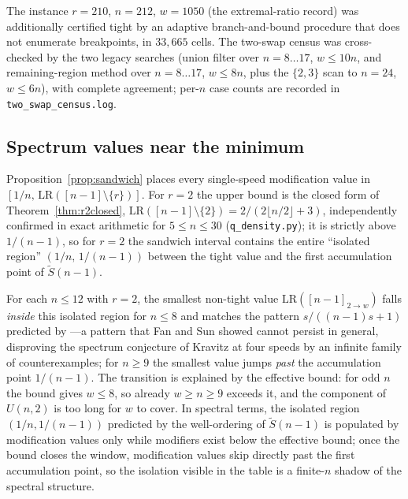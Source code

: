 \documentclass[11pt]{article}
\theoremstyle{definition}
\newcommand{\LR}{\mathrm{LR}}
\begin{document}
The instance $r=210$, $n=212$, $w=1050$ (the extremal-ratio record) was
additionally certified tight by an adaptive branch-and-bound procedure that
does not enumerate breakpoints, in $33{,}665$ cells.  The two-swap census
was cross-checked by the two legacy searches (union filter over
$n=8\ldots17$, $w\le10n$, and remaining-region method over
$n=8\ldots17$, $w\le8n$, plus the $\{2,3\}$ scan to $n=24$, $w\le6n$),
with complete agreement; per-$n$ case counts are recorded in
\texttt{two\_swap\_census.log}.

\subsection{Spectrum values near the minimum}\label{sec:spectrum}
Proposition~\ref{prop:sandwich} places every single-speed modification value
in $[1/n,\,\LR([n-1]\setminus\{r\})]$. For $r=2$ the upper bound is the
closed form of Theorem~\ref{thm:r2closed},
$\LR([n-1]\setminus\{2\})=2/(2\lfloor n/2\rfloor+3)$, independently
confirmed in exact arithmetic for $5\le n\le30$
(\texttt{q\_density.py}); it is strictly above $1/(n-1)$,
so for $r=2$ the sandwich interval contains the entire ``isolated region''
$(1/n,\,1/(n-1))$ between the tight value and the first accumulation point
of $\widetilde{S}(n-1)$.

For each $n\le12$ with $r=2$, the smallest non-tight value
$\LR([n-1]_{2\to w})$ falls \emph{inside} this isolated region for $n\le8$
and matches the pattern $s/((n{-}1)s{+}1)$ predicted by
\cite[Conj.~1.1]{GiriKravitz2026}---a pattern that Fan and Sun
\cite{FanSun2026} showed cannot persist in general, disproving the
spectrum conjecture of Kravitz at four speeds by an infinite family of
counterexamples; for $n\ge9$ the smallest value jumps \emph{past} the
accumulation point $1/(n-1)$. The transition is explained by the effective
bound: for odd $n$ the bound gives $w\le8$, so already $w\ge n\ge9$ exceeds
it, and the component of $U(n,2)$ is too long for $w$ to cover. In
spectral terms, the isolated region $(1/n,1/(n-1))$ predicted by the
well-ordering of $\widetilde{S}(n-1)$ is populated by modification values
only while modifiers exist below the effective bound; once the bound
closes the window, modification values skip directly past the first
accumulation point, so the isolation visible in the table is a finite-$n$
shadow of the spectral structure.
\end{document}
